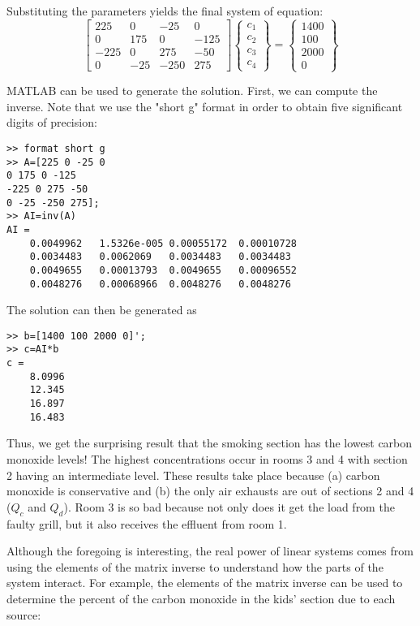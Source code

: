 \documentclass[../main.tex]{subfiles}
\begin{document}
Substituting the parameters yields the final system of equation:
\begin{equation}
\begin{bmatrix}
225& 0& -25& 0\\
0& 175& 0& -125\\
-225& 0& 275& -50\\
0& -25& -250& 275
\end{bmatrix}
\begin{Bmatrix}
c_{1}\\ 
c_{2}\\ 
c_{3}\\ 
c_{4}
\end{Bmatrix}
=
\begin{Bmatrix}
1400\\
100\\
2000\\
0
\end{Bmatrix}
\end{equation}

MATLAB can be used to generate the solution. First, we can compute the inverse. Note that we use the "short g" format in order to obtain five significant digits of precision:

\begin{lstlisting}[numbers=none]
>> format short g
>> A=[225 0 -25 0
0 175 0 -125
-225 0 275 -50
0 -25 -250 275];
>> AI=inv(A)
AI =
	0.0049962 	1.5326e-005	0.00055172 	0.00010728
	0.0034483 	0.0062069 	0.0034483 	0.0034483
	0.0049655 	0.00013793 	0.0049655 	0.00096552
	0.0048276 	0.00068966 	0.0048276 	0.0048276
\end{lstlisting}

The solution can then be generated as
\begin{lstlisting}[numbers=none]
>> b=[1400 100 2000 0]';
>> c=AI*b
c =
	8.0996
	12.345
	16.897
	16.483
\end{lstlisting}
Thus, we get the surprising result that the smoking section has the lowest carbon
monoxide levels! The highest concentrations occur in rooms 3 and 4 with section 2 having
an intermediate level. These results take place because (a) carbon monoxide is conservative and (b) the only air exhausts are out of sections 2 and 4 ($Q_{c}$ and $Q_{d}$). Room 3 is so bad
because not only does it get the load from the faulty grill, but it also receives the effluent
from room 1.

Although the foregoing is interesting, the real power of linear systems comes from
using the elements of the matrix inverse to understand how the parts of the system interact.
For example, the elements of the matrix inverse can be used to determine the percent of the
carbon monoxide in the kids' section due to each source:
\end{document}

